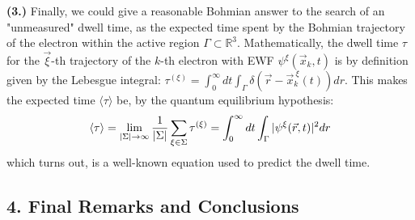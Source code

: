 \documentclass[11pt, a4paper]{article} %
\newcommand{\R}{\mathbb{R}} %
\begin{document}
{\bf (3.) }Finally, we could give a reasonable Bohmian answer to the search of an "unmeasured" dwell time, as the expected time spent by the Bohmian trajectory of the electron within the active region $\Gamma\subset \R^3$. Mathematically, the dwell time $\tau$ for the $\vec{\xi}$-th trajectory of the $k$-th electron with EWF $\psi^\xi(\vec{x}_k,t)$ is by definition given by the Lebesgue integral: $\tau^{( \xi)}= \int_{0}^\infty  dt \int_\Gamma \delta(\vec{r}-\vec{x}_k^{\:\xi}(t)) dr$. This makes the expected time $\langle \tau\rangle$ be, by the quantum equilibrium hypothesis:\vspace{-0.15cm}
\begin{equation}
\langle \tau \rangle = \lim_{|\Sigma|\rightarrow \infty}\frac{1}{|\Sigma|} \sum_{\xi\in\Sigma} \tau^{(\xi)} = \int_{0}^\infty dt \int_\Gamma |\psi^\xi(\vec{r},t)|^2dr\vspace{-0.15cm}
\end{equation}
which turns out, is a well-known equation used to predict the dwell time.\vspace{-0.2cm}


\subsection*{4. Final Remarks and Conclusions}\vspace{-0.15cm}
\end{document}

